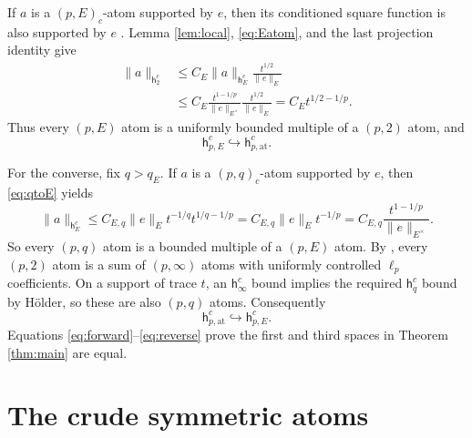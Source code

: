 \documentclass[11pt]{article}
\newcommand{\hpat}{\mathsf h^c_{p,\mathrm{at}}}
\begin{document}
If $a$ is a $(p,E)_c$-atom supported by $e$, then its conditioned square
function is also supported by $e$ \cite[Lemma 4.7]{HMW}.  Lemma
\ref{lem:local}, \eqref{eq:Eatom}, and the last projection identity give
\begin{align*}
 \|a\|_{\mathsf h_2^c}
 &\le C_E\|a\|_{\mathsf h_E^c}\frac{t^{1/2}}{\|e\|_E}\\
 &\le C_E\frac{t^{1-1/p}}{\|e\|_{E^\times}}
              \frac{t^{1/2}}{\|e\|_E}
 =C_E t^{1/2-1/p}.
\end{align*}
Thus every $(p,E)$ atom is a uniformly bounded multiple of a $(p,2)$ atom,
and
\begin{equation}\label{eq:forward}
 \mathsf h^c_{p,E}\hookrightarrow\hpat.
\end{equation}

For the converse, fix $q>q_E$.  If $a$ is a $(p,q)_c$-atom supported by $e$,
then \eqref{eq:qtoE} yields
\[
 \|a\|_{\mathsf h_E^c}
 \le C_{E,q}\|e\|_E t^{-1/q}t^{1/q-1/p}
 =C_{E,q}\|e\|_E t^{-1/p}
 =C_{E,q}\frac{t^{1-1/p}}{\|e\|_{E^\times}}.
\]
So every $(p,q)$ atom is a bounded multiple of a $(p,E)$ atom.  By
\cite[Theorem 4.3]{CRX}, every $(p,2)$ atom is a sum of $(p,\infty)$ atoms with
uniformly controlled $\ell_p$ coefficients.  On a support of trace $t$, an
$\mathsf h_\infty^c$ bound implies the required $\mathsf h_q^c$ bound by
Hölder, so these are also $(p,q)$ atoms.  Consequently
\begin{equation}\label{eq:reverse}
 \hpat\hookrightarrow\mathsf h^c_{p,E}.
\end{equation}
Equations \eqref{eq:forward}--\eqref{eq:reverse} prove the first and third
spaces in Theorem \ref{thm:main} are equal.

\section{The crude symmetric atoms}
\end{document}
